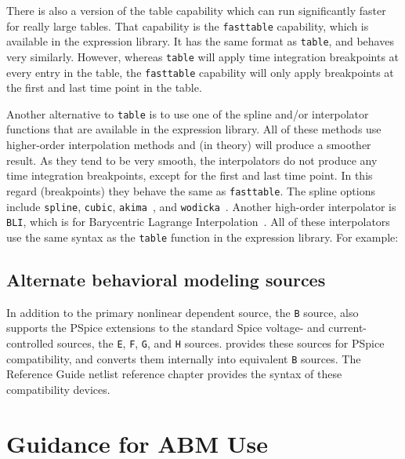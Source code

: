 
There is also a version of the table capability which can run significantly faster 
for really large tables.  That capability is the \texttt{fasttable} capability, 
which is available in the \Xyce{} expression library.
It has the same format as \texttt{table}, and behaves very similarly.  However, 
whereas \texttt{table} will apply time integration breakpoints at every entry in 
the table, the \texttt{fasttable} capability will only apply breakpoints at 
the first and last time point in the table.

Another alternative to \texttt{table} is to use one of the spline and/or interpolator functions that are 
available in the \Xyce{} expression library.   All of these methods use higher-order 
interpolation methods and (in theory) will produce a smoother result.  As they 
tend to be very smooth, the interpolators do not produce any time integration 
breakpoints, except for the first and last time point.  In this regard 
(breakpoints) they behave the same as \texttt{fasttable}.
The spline options include \texttt{spline}, \texttt{cubic}, 
\texttt{akima}~\cite{10.1145/321607.321609}, and \texttt{wodicka}~\cite{Engeln1996}. 
Another high-order interpolator is \texttt{BLI}, which is for Barycentric Lagrange 
Interpolation~\cite{Berrut_barycentriclagrange}.  All of these interpolators use the same 
syntax as the \texttt{table} function in the expression library.  For example:


\subsection{Alternate behavioral modeling sources}

In addition to the primary nonlinear dependent source, the \verb+B+
source, \Xyce{} also supports the PSpice extensions to the standard
Spice voltage- and current-controlled sources, the \verb+E+, \verb+F+,
\verb+G+, and \verb+H+ sources.  \Xyce{} provides these sources for
PSpice compatibility, and converts them internally into equivalent
\verb+B+ sources.  The \Xyce{} Reference Guide\ReferenceGuide{} netlist
reference chapter provides the syntax of these compatibility devices.

\section{Guidance for ABM Use}
\label{ABM_Guidance}

